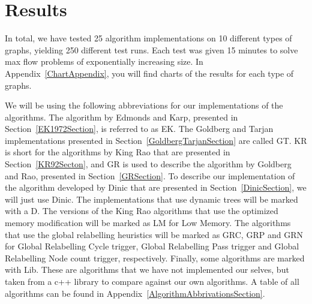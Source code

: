 

\clearpage
\section{Results}
\label{ResultsSection}

In total, we have tested 25 algorithm implementations on 10 different types of graphs, yielding 250 different test runs. 
Each test was given 15 minutes to solve max flow problems of exponentially increasing size.
In Appendix~\ref{ChartAppendix}, you will find charts of the results for each type of graphs.

We will be using the following abbreviations for our implementations of the algorithms.
The algorithm by Edmonds and Karp, presented in Section~\ref{EK1972Section}, is referred to as EK. The Goldberg and Tarjan implementations presented in Section~\ref{GoldbergTarjanSection} are called GT. 
KR is short for the algorithms by King Rao that are presented in Section~\ref{KR92Secton}, and GR is used to describe the algorithm by Goldberg and Rao, presented in Section~\ref{GRSection}.
To describe our implementation of the algorithm developed by Dinic that are presented in Section~\ref{DinicSection}, we will just use Dinic.
The implementations that use dynamic trees will be marked with a D. The versions of the King Rao algorithms that use the optimized memory modification will be marked as LM for Low Memory.
The algorithms that use the global relabelling heuristics will be marked as GRC, GRP and GRN for Global Relabelling Cycle trigger, Global Relabelling Pass trigger and Global Relabelling Node count trigger, respectively.
Finally, some algorithms are marked with Lib. These are algorithms that we have not implemented our selves, but taken from a c++ library to compare against our own algorithms.
A table of all algorithms can be found in Appendix~\ref{AlgorithmAbbrivationsSection}.

